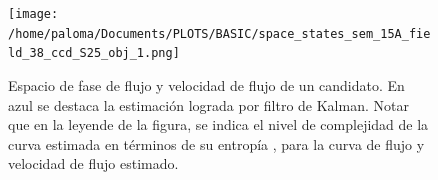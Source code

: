 \begin{figure}[h!]
\centering

\texttt{[image: /home/paloma/Documents/PLOTS/BASIC/space\_states\_sem\_15A\_field\_38\_ccd\_S25\_obj\_1.png]}
\caption{Espacio de fase de flujo y velocidad de flujo de un candidato. En azul se destaca la estimaci\'on lograda por filtro de Kalman. Notar que en la leyende de la figura, se indica el nivel de complejidad de la curva estimada en t\'erminos de su entrop\'ia \cite{balestrino}, para la curva de flujo y velocidad de flujo estimado.}
\label{fig:sp_st}
\end{figure}
